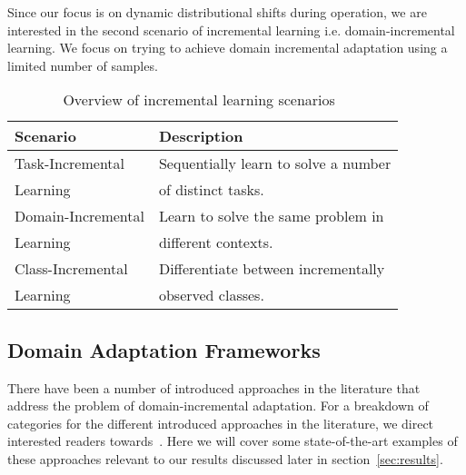 Since our focus is on dynamic distributional shifts during operation, we are interested in the second scenario of incremental learning i.e. domain-incremental learning. We focus on trying to achieve domain incremental adaptation using a limited number of samples.

\begin{table}[]
    \centering
    \begin{tabular}{l|l}
         \textbf{Scenario} & \textbf{Description}  \\ \hline
         Task-Incremental & Sequentially learn to solve a number \\
         Learning & of distinct tasks.\\\hline
         
         Domain-Incremental & Learn to solve the same problem in \\
         Learning & different contexts.\\ \hline
         Class-Incremental & Differentiate between incrementally\\
         Learning & observed classes. \\\hline
         
    \end{tabular}
    \caption{Overview of incremental learning scenarios~\cite{Ven2022}}
    \label{tab:incremental_types}
\end{table}



\subsection{Domain Adaptation Frameworks}
There have been a number of introduced approaches in the literature that address the problem of domain-incremental adaptation.
%
For a breakdown of categories for the different introduced approaches in the literature, we direct interested readers towards~\cite{mirza2022norm}.
%
Here we will cover some state-of-the-art examples of these approaches relevant to our results discussed later in section~\ref{sec:results}.


